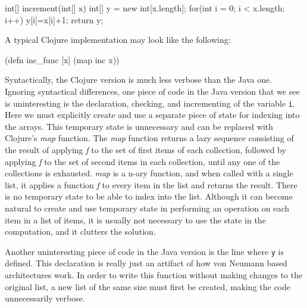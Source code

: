 int[] increment(int[] x) {
	int[] y = new int[x.length];
	for(int i = 0; i < x.length; i++) { 
	  y[i]=x[i]+1;
         }
         return y;
}

A typical Clojure implementation may look like the following: 

(defn inc_func [x] (map inc x))

Syntactically, the Clojure version is much less verbose than the Java one.
Ignoring syntactical differences, one piece of code in the Java version that we see is uninteresting is the declaration,
checking, and incrementing of the variable {\tt i}. 
Here we must explicitly create and use a separate piece of state for indexing into the arrays. 
This temporary state is unnecessary and can be replaced with Clojure's
{\it map} function. The {\it map} function returns a lazy sequence
consisting of the result of applying {\it f} to the
set of first items of each collection, followed by applying {\it f} to the set
of second items in each collection, until any one of the collections is
exhausted. {\it map} is a n-ary function, and when called with a
single list, it applies a function {\it f} to every item in the list
and returns the result. 
There is no temporary state to be able to index into the list. 
Although it can become natural to create and use temporary state in performing an operation on each item in a list of items,
it is usually not necessary to use the state in the computation, and it clutters the solution. 

Another uninteresting piece of code in the Java version is the line
where {\tt y} is defined. 
This declaration is really just an artifact of how von Neumann based
architectures work. 
In order to write this function without making changes to 
the original list, a new list of the same size must first be created, making the code unnecessarily verbose. 

